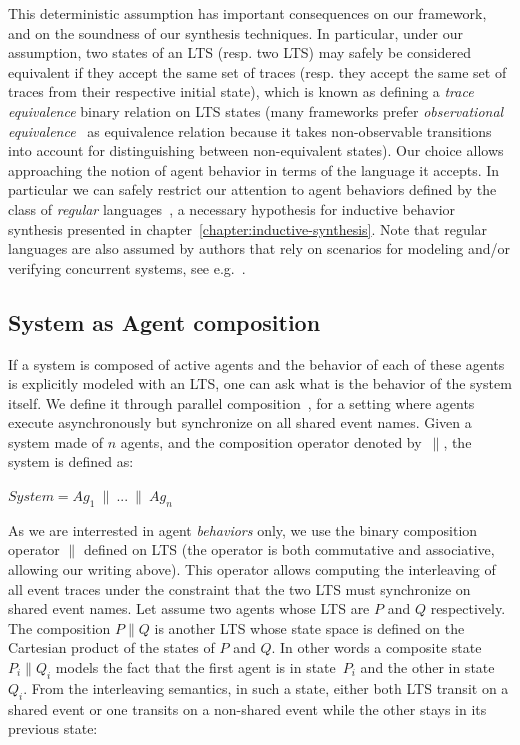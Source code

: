 This deterministic assumption has important consequences on our framework, and on the soundness of our synthesis techniques. In particular, under our assumption, two states of an LTS (resp. two LTS) may safely be considered equivalent if they accept the same set of traces (resp. they accept the same set of traces from their respective initial state), which is known as defining a \emph{trace equivalence} binary relation on LTS states (many frameworks prefer \emph{observational equivalence}~\cite{Milner:1989} as equivalence relation because it takes non-observable transitions into account for distinguishing between non-equivalent states). Our choice allows approaching the notion of agent behavior in terms of the language it accepts. In particular we can safely restrict our attention to agent behaviors defined by the class of \emph{regular} languages~\cite{Hopcroft:1979}, a necessary hypothesis for inductive behavior synthesis presented in chapter~\ref{chapter:inductive-synthesis}. Note that regular languages are also assumed by authors that rely on scenarios for modeling and/or verifying concurrent systems, see e.g.~\cite{Alur:1999, Uchitel:2003, Uchitel:2004}.

\subsection{System as Agent composition}

If a system is composed of active agents and the behavior of each of these agents is explicitly modeled with an LTS, one can ask what is the behavior of the system itself. We define it through parallel composition~\cite{Hoare:1985}, for a setting where agents execute asynchronously but synchronize on all shared event names. Given a system made of $n$ agents, and the composition operator denoted by~$\parallel$, the system is defined as:

\begin{center}
$System = Ag_1~\parallel~...~\parallel~Ag_n$ 
\end{center}

As we are interrested in agent \emph{behaviors} only, we use the binary composition operator $\parallel$ defined on LTS (the operator is both commutative and associative, allowing our writing above). This operator allows computing the interleaving of all event traces under the constraint that the two LTS must synchronize on shared event names. Let assume two agents whose LTS are $P$ and $Q$ respectively. The composition $P \parallel Q$ is another LTS whose state space is defined on the Cartesian product of the states of $P$ and $Q$. In other words a composite state $P_i \parallel Q_i$ models the fact that the first agent is in state~$P_i$ and the other in state~$Q_i$. From the interleaving semantics, in such a state, either both LTS transit on a shared event or one transits on a non-shared event while the other stays in its previous state:

